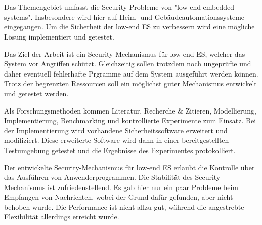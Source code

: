 
%
\section*{\thesisheading} %



 Das Themengebiet umfasst die Security-Probleme von "low-end embedded systems". 
Insbesondere wird hier auf Heim- und Gebäudeautomationssysteme eingegangen. Um die Sicherheit der low-end ES zu 
verbessern wird eine mögliche Lösung implementiert und getestet.

 Das Ziel der Arbeit ist ein Security-Mechanismus für low-end ES, welcher das System 
vor Angriffen schützt. Gleichzeitig sollen trotzdem noch ungeprüfte und daher eventuell fehlerhafte Prgramme 
auf dem System ausgeführt werden können. Trotz der begrenzten Ressourcen soll ein möglichst guter Mechanismus 
entwickelt und getestet werden.

 Als Forschungsmethoden kommen Literatur, Recherche & Zitieren, Modellierung, 
Implementierung, Benchmarking und kontrollierte Experimente zum Einsatz. Bei der Implementierung wird vorhandene
Sicherheitssoftware erweitert und modifiziert. Diese erweiterte Software wird dann in einer bereitgestellten Testumgebung
getestet und die Ergebnisse des Experimentes protokolliert.

 Der entwickelte Security-Mechanismus für low-end ES erlaubt die Kontrolle über das Ausführen von
Anwenderprogrammen. Die Stabilität des Security-Mechanismus ist zufriedenstellend. Es gab hier nur ein paar Probleme beim
Empfangen von Nachrichten, wobei der Grund dafür gefunden, aber nicht behoben wurde. Die Performance ist nicht allzu gut,
während die angestrebte Flexibilität allerdings erreicht wurde.


%
\section*{\thesisheading} %


